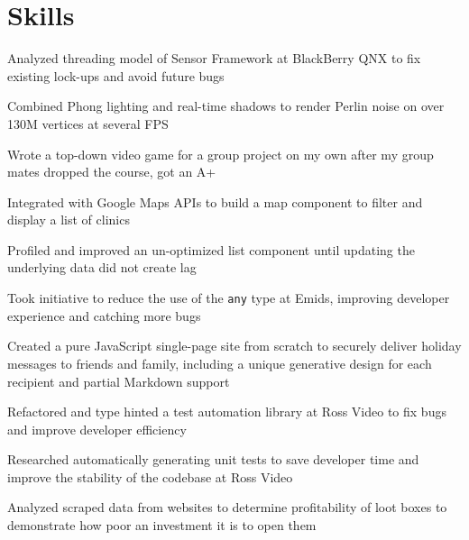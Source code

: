 \section{Skills}

\begin{bullets}
	\item Analyzed threading model of Sensor Framework at BlackBerry QNX to fix existing lock-ups and avoid future bugs
	\item Combined Phong lighting and real-time shadows to render Perlin noise on over 130M vertices at several FPS
    \item Wrote a top-down video game for a group project on my own after my group mates dropped the course, got an A+
\end{bullets}

\begin{bullets}
    \item Integrated with Google Maps APIs to build a map component to filter and display a list of clinics
    \item Profiled and improved an un-optimized list component until updating the underlying data did not create lag
    \item Took initiative to reduce the use of the \texttt{any} type at Emids, improving developer experience and catching more bugs
    \item Created a pure JavaScript single-page site from scratch to securely deliver holiday messages to friends and family, including a unique generative design for each recipient and partial Markdown support
\end{bullets}

\newpage %

\begin{bullets}
    \item Refactored and type hinted a test automation library at Ross Video to fix bugs and improve developer efficiency
    \item Researched automatically generating unit tests to save developer time and improve the stability of the codebase at Ross Video
    \item Analyzed scraped data from websites to determine profitability of loot boxes to demonstrate how poor an investment it is to open them
\end{bullets}

